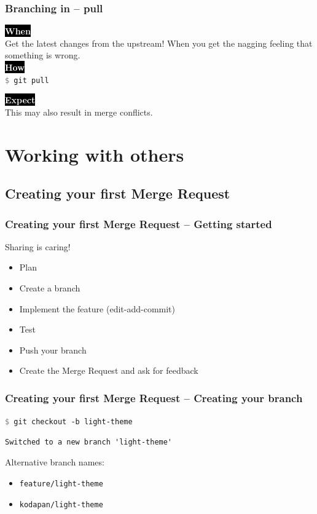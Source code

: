 \documentclass{beamer}
\newcommand{\keyword}[1]{\hspace{-1.0em}\colorbox{black}{\textcolor{white}{\textbf{#1}\vphantom{Ep}}}\vspace{0.2em}} %
\newcommand{\command}[1]{\texttt{\textcolor{gray}{\$} {#1}}}
\begin{document}
\begin{frame}
  \frametitle{Branching in -- pull}
    \keyword{When}\\
    Get the latest changes from the upstream! When you get the nagging feeling
    that something is wrong. \\[1em]

    \keyword{How}\\
    \command{git pull} \\[3em]

    \pause

    \keyword{Expect}\\
    This may also result in \alert{merge conflicts}. \\[1em]
\end{frame}



\section{Working with others}
\subsection{Creating your first Merge Request}

\begin{frame}[fragile]
  \frametitle{Creating your first Merge Request -- Getting started}
  Sharing is caring!
  \pause{}
  \begin{itemize}[<+->]
    \item Plan
    \item Create a branch
    \item Implement the feature (edit-add-commit)
    \item Test
    \item Push your branch
    \item Create the Merge Request and ask for feedback
  \end{itemize}
\end{frame}

\begin{frame}[fragile]
  \frametitle{Creating your first Merge Request -- Creating your branch}
  \command{git checkout -b light-theme}
\begin{verbatim}
Switched to a new branch 'light-theme'
\end{verbatim}

\pause{}

Alternative branch names:
\begin{itemize}
  \item \texttt{feature/light-theme}
  \item \texttt{kodapan/light-theme}
\end{itemize}
\end{frame}
\end{document}
